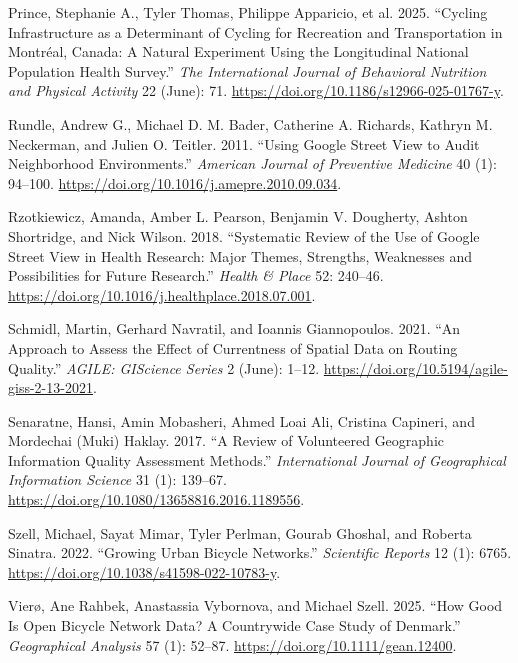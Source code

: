 \documentclass[
]{article}
\newlength{\cslhangindent}
\newenvironment{CSLReferences}[2] %
 {\begin{list}{}{%
  \setlength{\itemindent}{0pt}
  \setlength{\leftmargin}{0pt}
  \setlength{\parsep}{0pt}
  \ifodd #1
   \setlength{\leftmargin}{\cslhangindent}
   \setlength{\itemindent}{-1\cslhangindent}
  \fi
  \setlength{\itemsep}{#2\baselineskip}}}
 {\end{list}}
\begin{document}
\begin{CSLReferences}{1}{1}
Prince, Stephanie A., Tyler Thomas, Philippe Apparicio, et al. 2025.
{``Cycling Infrastructure as a Determinant of Cycling for Recreation and
Transportation in {Montréal}, {Canada}: A Natural Experiment Using the
Longitudinal National Population Health Survey.''} \emph{The
International Journal of Behavioral Nutrition and Physical Activity} 22
(June): 71. \url{https://doi.org/10.1186/s12966-025-01767-y}.

Rundle, Andrew G., Michael D. M. Bader, Catherine A. Richards, Kathryn
M. Neckerman, and Julien O. Teitler. 2011. {``Using {Google} {Street}
{View} to {Audit} {Neighborhood} {Environments}.''} \emph{American
Journal of Preventive Medicine} 40 (1): 94--100.
\url{https://doi.org/10.1016/j.amepre.2010.09.034}.

Rzotkiewicz, Amanda, Amber L. Pearson, Benjamin V. Dougherty, Ashton
Shortridge, and Nick Wilson. 2018. {``Systematic Review of the Use of
Google Street View in Health Research: Major Themes, Strengths,
Weaknesses and Possibilities for Future Research.''} \emph{Health \&
Place} 52: 240--46.
\url{https://doi.org/10.1016/j.healthplace.2018.07.001}.

Schmidl, Martin, Gerhard Navratil, and Ioannis Giannopoulos. 2021. {``An
{Approach} to {Assess} the {Effect} of {Currentness} of {Spatial} {Data}
on {Routing} {Quality}.''} \emph{AGILE: GIScience Series} 2 (June):
1--12. \url{https://doi.org/10.5194/agile-giss-2-13-2021}.

Senaratne, Hansi, Amin Mobasheri, Ahmed Loai Ali, Cristina Capineri, and
Mordechai (Muki) Haklay. 2017. {``A Review of Volunteered Geographic
Information Quality Assessment Methods.''} \emph{International Journal
of Geographical Information Science} 31 (1): 139--67.
\url{https://doi.org/10.1080/13658816.2016.1189556}.

Szell, Michael, Sayat Mimar, Tyler Perlman, Gourab Ghoshal, and Roberta
Sinatra. 2022. {``Growing Urban Bicycle Networks.''} \emph{Scientific
Reports} 12 (1): 6765. \url{https://doi.org/10.1038/s41598-022-10783-y}.

Vierø, Ane Rahbek, Anastassia Vybornova, and Michael Szell. 2025. {``How
{Good} {Is} {Open} {Bicycle} {Network} {Data}? {A} {Countrywide} {Case}
{Study} of {Denmark}.''} \emph{Geographical Analysis} 57 (1): 52--87.
\url{https://doi.org/10.1111/gean.12400}.


\end{CSLReferences}
\end{document}
